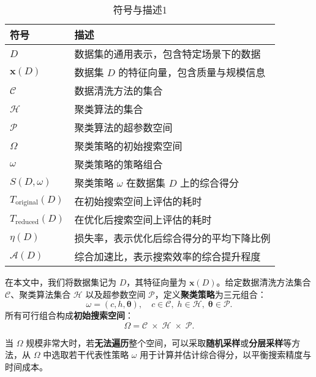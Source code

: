 \documentclass[8pt,twocolumn]{article} %
\numberwithin{equation}{section}
\begin{document}
\begin{table}[ht]
\centering
\caption{符号与描述1}
\label{tab:symbols-basic}
\begin{tabular}{ll}
\toprule
\textbf{符号} & \textbf{描述} \\
\midrule
$D$ & 数据集的通用表示，包含特定场景下的数据 \\
$\mathbf{x}(D)$ & 数据集 $D$ 的特征向量，包含质量与规模信息 \\
$\mathcal{C}$ & 数据清洗方法的集合 \\
$\mathcal{H}$ & 聚类算法的集合 \\
$\mathcal{P}$ & 聚类算法的超参数空间 \\
$\Omega$ & 聚类策略的初始搜索空间 \\
$\omega$ & 聚类策略的策略组合 \\
$S(D, \omega)$ & 聚类策略 $\omega$ 在数据集 $D$ 上的综合得分 \\
$T_{\text{original}}(D)$ & 在初始搜索空间上评估的耗时 \\
$T_{\text{reduced}}(D)$ & 在优化后搜索空间上评估的耗时 \\
$\eta(D)$ & 损失率，表示优化后综合得分的平均下降比例 \\
$\mathcal{A}(D)$ & 综合加速比，表示搜索效率的综合提升程度 \\

\bottomrule
\end{tabular}
\end{table}
在本文中，我们将数据集记为 \(D\)，其特征向量为 \(\mathbf{x}(D)\)。给定数据清洗方法集合 \(\mathcal{C}\)、聚类算法集合 \(\mathcal{H}\) 以及超参数空间 \(\mathcal{P}\)，定义\textbf{聚类策略}为三元组合：
\begin{equation}\label{eq:omega-def}
\omega = (c, h, \boldsymbol{\theta}), 
\quad 
c \in \mathcal{C},\; h \in \mathcal{H},\; \boldsymbol{\theta} \in \mathcal{P}.
\end{equation}
所有可行组合构成\textbf{初始搜索空间}：
\begin{equation}\label{eq:search-space}
\Omega = \mathcal{C} \;\times\; \mathcal{H} \;\times\; \mathcal{P}.
\end{equation}

当 \(\Omega\) 规模非常大时，若\textbf{无法遍历}整个空间，可以采取\textbf{随机采样}或\textbf{分层采样}等方法，从 \(\Omega\) 中选取若干代表性策略 \(\omega\) 用于计算并估计综合得分，以平衡搜索精度与时间成本。

\end{document}
